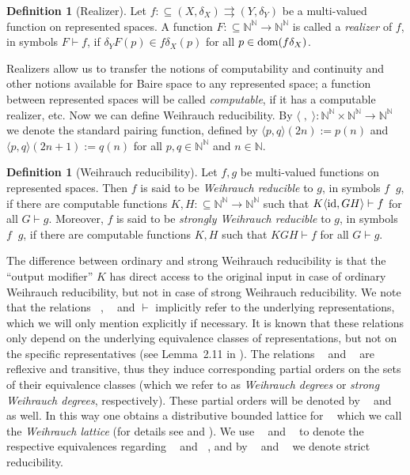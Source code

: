 \documentclass[a4paper]{amsart}
\def\IN{{\mathbb{N}}}
\def\In{\subseteq}
\def\mto{\rightrightarrows}
\def\id{{\rm id}}
\def\dom{{\rm dom}}
\def\Baire{{\IN^\IN}}
\def\leqW{\mathop{\leq_{\mathrm{W}}}}
\def\equivW{\mathop{\equiv_{\mathrm{W}}}}
\def\leqSW{\mathop{\leq_{\mathrm{sW}}}}
\def\equivSW{\mathop{\equiv_{\mathrm{sW}}}}
\def\lW{\mathop{<_{\mathrm{W}}}}
\def\lSW{\mathop{<_{\mathrm{sW}}}}
\theoremstyle{definition}
\newtheorem{definition}[theorem]{Definition}
\begin{document}
\begin{definition}[Realizer]
Let $f : \In (X, \delta_X) \mto (Y, \delta_Y)$ be a multi-valued function on represented spaces.
A function $F:\In\IN^\IN\to\IN^\IN$ is called a {\em realizer} of $f$, in symbols $F\vdash f$, if
$\delta_YF(p)\in f\delta_X(p)$ for all $p\in\dom(f\delta_X)$.
\end{definition}

Realizers allow us to transfer the notions of computability
and continuity and other notions available for Baire space to any represented space;
a function between represented spaces will be called {\em computable}, if it has a computable realizer, etc.
Now we can define Weihrauch reducibility.
By $\langle\;,\;\rangle:\Baire\times\Baire\to\Baire$ we denote the standard pairing function, defined by
$\langle p,q\rangle(2n):=p(n)$ and $\langle p,q\rangle(2n+1):=q(n)$ for all $p,q\in\Baire$ and $n\in\IN$.

\begin{definition}[Weihrauch reducibility]
Let $f,g$ be multi-valued functions on represented spaces. 
Then $f$ is said to be {\em Weihrauch reducible} to $g$, in symbols $f\leqW g$, if there are computable
functions $K,H:\In\IN^\IN\to\IN^\IN$ such that $K\langle \id, GH \rangle \vdash f$ for all $G \vdash g$.
Moreover, $f$ is said to be {\em strongly Weihrauch reducible} to $g$, in symbols $f\leqSW g$,
if there are computable functions $K,H$ such that $KGH\vdash f$ for all $G\vdash g$.
\end{definition}

The difference between ordinary and strong Weihrauch reducibility is that the ``output modifier'' $K$ has
direct access to the original input in case of ordinary Weihrauch reducibility, but not in case of strong Weihrauch reducibility. 
We note that the relations $\leqW$, $\leqSW$ and $\vdash$ implicitly refer to the underlying representations, which
we will only mention explicitly if necessary. It is known that these relations only depend on the underlying equivalence
classes of representations, but not on the specific representatives (see Lemma~2.11 in \cite{BG11}).
The relations $\leqW$ and $\leqSW$ are reflexive and transitive, thus they induce corresponding partial orders on the sets of 
their equivalence classes (which we refer to as {\em Weihrauch degrees} or {\em strong Weihrauch degrees}, respectively).
These partial orders will be denoted by $\leqW$ and $\leqSW$ as well. In this way one obtains a distributive bounded lattice for $\leqW$
which we call the {\em Weihrauch lattice} (for details see \cite{Pau09} and \cite{BG11}).
We use $\equivW$ and $\equivSW$ to denote the respective equivalences regarding $\leqW$ and $\leqSW$, 
and by $\lW$ and $\lSW$ we denote strict reducibility.
\end{document}
